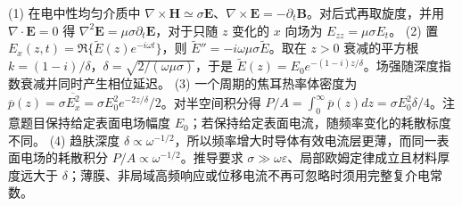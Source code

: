 (1) 在电中性均匀介质中 \(\nabla\times\boldsymbol H\simeq\sigma\boldsymbol E\)、\(\nabla\times\boldsymbol E=-\partial_t\boldsymbol B\)。对后式再取旋度，并用 \(\nabla\cdot\boldsymbol E=0\) 得 \(\nabla^2\boldsymbol E=\mu\sigma\partial_t\boldsymbol E\)，对于只随 \(z\) 变化的 \(x\) 向场为 \(E_{zz}=\mu\sigma E_t\)。
(2) 置 \(E_x(z,t)=\Re\{\widetilde E(z)e^{-i\omega t}\}\)，则 \(\widetilde E''=-i\omega\mu\sigma\widetilde E\)。取在 \(z>0\) 衰减的平方根 \(k=(1-i)/\delta\)，\(\delta=\sqrt{2/(\omega\mu\sigma)}\)，于是 \(\widetilde E(z)=E_0e^{-(1-i)z/\delta}\)。场强随深度指数衰减并同时产生相位延迟。
(3) 一个周期的焦耳热率体密度为 \(\overline p(z)=\sigma\overline{E_x^2}=\sigma E_0^2 e^{-2z/\delta}/2\)。对半空间积分得 \(P/A=\int_0^\infty\overline p(z)dz=\sigma E_0^2\delta/4\)。注意题目保持给定表面电场幅度 \(E_0\)；若保持给定表面电流，随频率变化的耗散标度不同。
(4) 趋肤深度 \(\delta\propto\omega^{-1/2}\)，所以频率增大时导体有效电流层更薄，而同一表面电场的耗散积分 \(P/A\propto\omega^{-1/2}\)。推导要求 \(\sigma\gg\omega\varepsilon\)、局部欧姆定律成立且材料厚度远大于 \(\delta\)；薄膜、非局域高频响应或位移电流不再可忽略时须用完整复介电常数。
